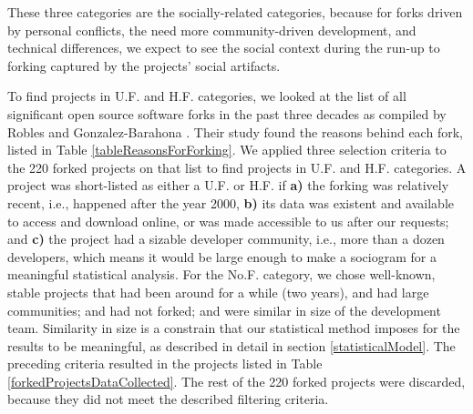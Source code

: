 \documentclass[12pt]{report}
\begin{document}
These three categories are the socially-related categories, because for forks driven by personal conflicts, the need more community-driven development, and technical differences, we expect to see the social context during the run-up to forking captured by the projects' social artifacts.

To find projects in U.F. and H.F. categories, we looked at the list of all significant open source software forks in the past three decades as compiled by Robles and Gonzalez-Barahona \cite{Robles}. Their study found the reasons behind each fork, listed in Table \ref{tableReasonsForForking}. We applied three selection criteria to the 220 forked projects on that list to find projects in U.F. and H.F. categories. A project was short-listed as either a U.F. or H.F. if \textbf{a)} the forking was relatively recent, i.e., happened after the year 2000, \textbf{b)} its data was existent and available to access and download online, or was made accessible to us after our requests; and \textbf{c)} the project had a sizable developer community, i.e., more than a dozen developers, which means it would be large enough to make a sociogram for a meaningful statistical analysis. For the No.F. category, we chose well-known, stable projects that had been around for a while (two years), and had large communities; and had not forked; and were similar in size of the development team. Similarity in size is a constrain that our statistical method imposes for the results to be meaningful, as described in detail in section \ref{statisticalModel}.  The preceding criteria resulted in the projects listed in Table \ref{forkedProjectsDataCollected}. The rest of the 220 forked projects were discarded, because they did not meet the described filtering criteria.
\end{document}
